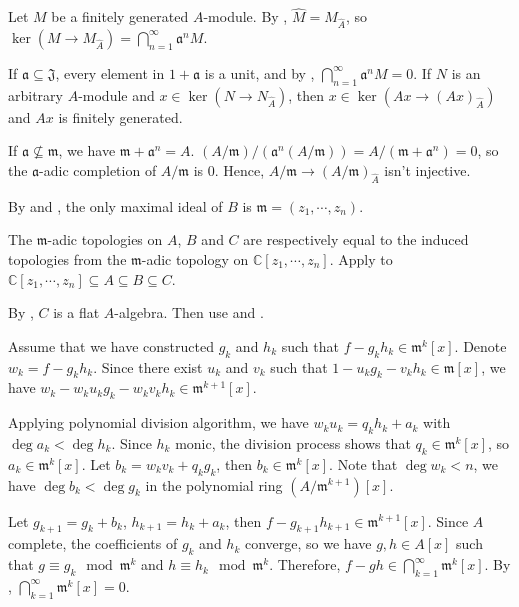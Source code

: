 \begin{exercise}\label{ex10.7}
	Let $M$ be a finitely generated $A$-module. By , $\hat{M}=M_{\hat{A}}$, so $\ker\left(M\rightarrow M_{\hat{A}}\right)=\bigcap_{n=1}^\infty\mathfrak{a}^nM$.
	
	If $\mathfrak{a}\subseteq\mathfrak{J}$, every element in $1+\mathfrak{a}$ is a unit, and by , $\bigcap_{n=1}^\infty\mathfrak{a}^nM=0$. If $N$ is an arbitrary $A$-module and $x\in\ker\left(N\rightarrow N_{\hat{A}}\right)$, then $x\in\ker\left(Ax\rightarrow (Ax)_{\hat{A}}\right)$ and $Ax$ is finitely generated.
	
	If $\mathfrak{a}\nsubseteq\mathfrak{m}$, we have $\mathfrak{m}+\mathfrak{a}^n=A$. $(A/\mathfrak{m})/\left(\mathfrak{a}^n(A/\mathfrak{m})\right)=A/\left(\mathfrak{m}+\mathfrak{a}^n\right)=0$, so the $\mathfrak{a}$-adic completion of $A/\mathfrak{m}$ is 0. Hence, $A/\mathfrak{m}\rightarrow (A/\mathfrak{m})_{\hat{A}}$ isn't injective.
\end{exercise}

\begin{exercise}\label{ex10.8}
	By  and , the only maximal ideal of $B$ is $\mathfrak{m}=(z_1,\cdots,z_n)$.
	
	The $\mathfrak{m}$-adic topologies on $A$, $B$ and $C$ are respectively equal to the induced topologies from the $\mathfrak{m}$-adic topology on $\mathbb{C}[z_1,\cdots,z_n]$. Apply  to $\mathbb{C}[z_1,\cdots,z_n]\subseteq A\subseteq B\subseteq C$.
	
	By , $C$ is a flat $A$-algebra. Then use  and .
\end{exercise}

\begin{exercise}\label{ex10.9}
	Assume that we have constructed $g_k$ and $h_k$ such that $f-g_kh_k\in\mathfrak{m}^k[x]$. Denote $w_k=f-g_kh_k$. Since there exist  $u_k$ and $v_k$ such that $1-u_kg_k-v_kh_k\in\mathfrak{m}[x]$, we have $w_k-w_ku_kg_k-w_kv_kh_k\in\mathfrak{m}^{k+1}[x]$.
	
	Applying polynomial division algorithm, we have $w_ku_k=q_kh_k+a_k$ with $\deg a_k<\deg h_k$. Since $h_k$ monic, the division process shows that  $q_k\in\mathfrak{m}^k[x]$, so $a_k\in\mathfrak{m}^k[x]$. Let $b_k=w_kv_k+q_kg_k$, then $b_k\in\mathfrak{m}^k[x]$. Note that $\deg w_k<n$, we have $\deg b_k<\deg g_k$ in the polynomial ring $\left(A/\mathfrak{m}^{k+1}\right)[x]$.
	
	Let $g_{k+1}=g_k+b_k$, $h_{k+1}=h_k+a_k$, then $f-g_{k+1}h_{k+1}\in\mathfrak{m}^{k+1}[x]$. Since $A$ complete, the coefficients of $g_k$ and $h_k$ converge, so we have $g, h\in A[x]$ such that $g\equiv g_k\mod\mathfrak{m}^k$ and $h\equiv h_k\mod\mathfrak{m}^k$. Therefore, $f-gh\in\bigcap_{k=1}^\infty\mathfrak{m}^k[x]$. By , $\bigcap_{k=1}^\infty\mathfrak{m}^k[x]=0$.
\end{exercise}

